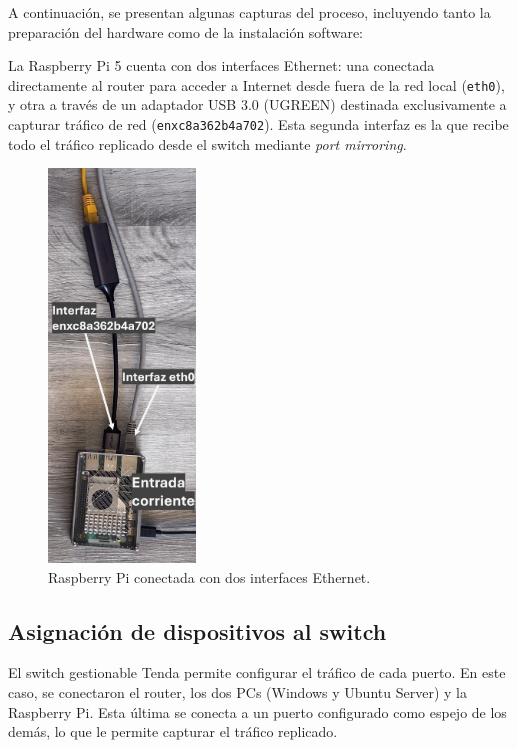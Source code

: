 \documentclass[12pt,a4paper]{report}
\begin{document}
A continuación, se presentan algunas capturas del proceso, incluyendo tanto la preparación del hardware como de la instalación software:\newline

La Raspberry Pi 5 cuenta con dos interfaces Ethernet: una conectada directamente al router para acceder a Internet desde fuera de la red local (\texttt{eth0}), y otra a través de un adaptador USB 3.0 (UGREEN) destinada exclusivamente a capturar tráfico de red (\texttt{enxc8a362b4a702}). Esta segunda interfaz es la que recibe todo el tráfico replicado desde el switch mediante \textit{port mirroring}.

\begin{figure}[H]
	\centering
	\includegraphics[width=0.35\textwidth]{pruebas_config/1-1.JPG}
	\caption{Raspberry Pi conectada con dos interfaces Ethernet.}
\end{figure}

\pagebreak

\subsection*{Asignación de dispositivos al switch}

El switch gestionable Tenda permite configurar el tráfico de cada puerto. En este caso, se conectaron el router, los dos PCs (Windows y Ubuntu Server) y la Raspberry Pi. Esta última se conecta a un puerto configurado como espejo de los demás, lo que le permite capturar el tráfico replicado.
\end{document}
